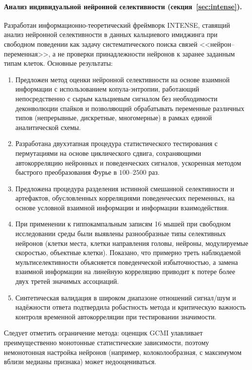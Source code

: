
\paragraph{Анализ индивидуальной нейронной селективности (секция~\ref{sec:intense}).}

Разработан информационно-теоретический фреймворк INTENSE, ставящий анализ нейронной селективности в данных кальциевого имиджинга при свободном поведении как задачу систематического поиска связей <<нейрон--переменная>>, а не проверки принадлежности нейронов к заранее заданным типам клеток. Основные результаты:

\begin{enumerate}
    \item Предложен метод оценки нейронной селективности на основе взаимной информации с использованием копула-энтропии, работающий непосредственно с сырым кальциевым сигналом без необходимости деконволюции спайков и позволяющий обрабатывать переменные различных типов (непрерывные, дискретные, многомерные) в рамках единой аналитической схемы.

    \item Разработана двухэтапная процедура статистического тестирования с пермутациями на основе циклического сдвига, сохраняющими автокорреляцию нейронных и поведенческих сигналов, ускоренная методом быстрого преобразования Фурье в $100$--$2500$ раз.

    \item Предложена процедура разделения истинной смешанной селективности и артефактов, обусловленных корреляциями поведенческих переменных, на основе условной взаимной информации и информации взаимодействия.

    \item При применении к гиппокампальным записям 16 мышей при свободном исследовании среды были выявлены разнообразные типы селективных нейронов (клетки места, клетки направления головы, нейроны, модулируемые скоростью, объектные клетки). Показано, что примерно треть наблюдаемой мультиселективности объясняется поведенческой избыточностью, а замена взаимной информации на линейную корреляцию приводит к потере более двух третей значимых ассоциаций.

    \item Синтетическая валидация в широком диапазоне отношений сигнал/шум и надёжности ответа подтвердила робастность метода и критическую важность контроля временной автокорреляции при тестировании значимости.
\end{enumerate}

Следует отметить ограничение метода: оценщик GCMI улавливает преимущественно монотонные статистические зависимости, поэтому немонотонная настройка нейронов (например, колоколообразная, с максимумом вблизи медианы признака) может недооцениваться.
